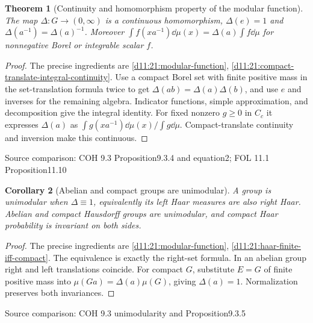 \documentclass[11pt,oneside,openany]{book}
\newtheorem{theorem}{Theorem}[chapter]
\newtheorem{corollary}[theorem]{Corollary}
\theoremstyle{definition}
\theoremstyle{remark}
\newcommand{\family}[1]{}
\newcommand{\source}[1]{\par\begingroup\small\sffamily\color{black!65}Source comparison: #1\par\endgroup}
\begin{document}
\begin{theorem}[Continuity and homomorphism property of the modular function]\family{D11.21.modular_properties}\label{d11:21:modular-properties}
The map $\Delta:G\to(0,\infty)$ is a continuous homomorphism, $\Delta(e)=1$ and $\Delta(a^{-1})=\Delta(a)^{-1}$. Moreover
$\int f(xa^{-1})\dd\mu(x)=\Delta(a)\int f\dd\mu$
for nonnegative Borel or integrable scalar $f$.
\end{theorem}
\begin{proof}
The precise ingredients are \cref{d11:21:modular-function}, \cref{d11:21:compact-translate-integral-continuity}. Use a compact Borel set with finite positive mass in the set-translation formula twice to get $\Delta(ab)=\Delta(a)\Delta(b)$, and use $e$ and inverses for the remaining algebra. Indicator functions, simple approximation, and decomposition give the integral identity. For fixed nonzero $g\ge0$ in $C_c$ it expresses $\Delta(a)$ as $\int g(xa^{-1})\dd\mu(x)/\int g\dd\mu$. Compact-translate continuity and inversion make this continuous.
\end{proof}
\source{COH 9.3 Proposition9.3.4 and equation2; FOL 11.1 Proposition11.10}

\begin{corollary}[Abelian and compact groups are unimodular]\family{D11.21.unimodular_cases}\label{d11:21:unimodular-cases}
A group is unimodular when $\Delta\equiv1$, equivalently its left Haar measures are also right Haar. Abelian and compact Hausdorff groups are unimodular, and compact Haar probability is invariant on both sides.
\end{corollary}
\begin{proof}
The precise ingredients are \cref{d11:21:modular-function}, \cref{d11:21:haar-finite-iff-compact}. The equivalence is exactly the right-set formula. In an abelian group right and left translations coincide. For compact $G$, substitute $E=G$ of finite positive mass into $\mu(Ga)=\Delta(a)\mu(G)$, giving $\Delta(a)=1$. Normalization preserves both invariances.
\end{proof}
\source{COH 9.3 unimodularity and Proposition9.3.5}
\end{document}
